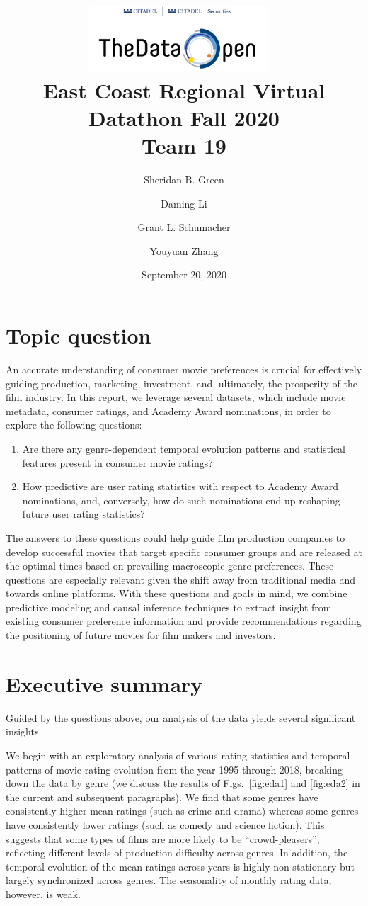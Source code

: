 \documentclass[dvipsnames]{article}
\title{%
\includegraphics[width=0.5\textwidth]{data-open-logo.jpg}~
\\[1cm]
East Coast Regional Virtual Datathon Fall 2020 \\[0.1cm]
\large Team 19}
\author[1]{Sheridan B. Green}
\author[1]{Daming Li}
\author[1]{Grant L. Schumacher}
\author[2]{Youyuan Zhang}
\affil[1]{Department of Physics, Yale University}
\affil[2]{Department of Mathematics, Courant Institute, New York University}
\date{September 20, 2020}
\begin{document}
\maketitle

\section{Topic question}
An accurate understanding of consumer movie preferences is crucial for effectively guiding production, marketing, investment, and, ultimately, the prosperity of the film industry. In this report, we leverage several datasets, which include movie metadata, consumer ratings, and Academy Award nominations, in order to explore the following questions:
%
\begin{enumerate}
    \item Are there any genre-dependent temporal evolution patterns and statistical features present in consumer movie ratings?
    \item How predictive are user rating statistics with respect to Academy Award nominations, and, conversely, how do such nominations end up reshaping future user rating statistics?
\end{enumerate}
%
The answers to these questions could help guide film production companies to develop successful movies that target specific consumer groups and are released at the optimal times based on prevailing macroscopic genre preferences. These questions are especially relevant given the shift away from traditional media and towards online platforms.  With these questions and goals in mind, we combine predictive modeling and causal inference techniques to extract insight from existing consumer preference information and provide recommendations regarding the positioning of future movies for film makers and investors.

\section{Executive summary}

Guided by the questions above, our analysis of the data yields several significant insights.

We begin with an exploratory analysis of various rating statistics and temporal patterns of movie rating evolution from the year 1995 through 2018, breaking down the data by genre (we discuss the results of Figs.~\ref{fig:eda1} and \ref{fig:eda2} in the current and subsequent paragraphs). We find that some genres have consistently higher mean ratings (such as crime and drama) whereas some genres have consistently lower ratings (such as comedy and science fiction). This suggests that some types of films are more likely to be ``crowd-pleasers'', reflecting different levels of production difficulty across genres. In addition, the temporal evolution of the mean ratings across years is highly non-stationary but largely synchronized across genres. The seasonality of monthly rating data, however, is weak.
\end{document}
